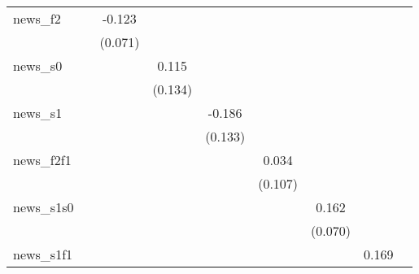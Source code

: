 {\begin{tabular}{l*{8}{c}}
news\_f2     &                     &      -0.123\sym{*}  &                     &                     &                     &                     &                     &                     \\
            &                     &     (0.071)         &                     &                     &                     &                     &                     &                     \\
\addlinespace
news\_s0     &                     &                     &       0.115         &                     &                     &                     &                     &                     \\
            &                     &                     &     (0.134)         &                     &                     &                     &                     &                     \\
\addlinespace
news\_s1     &                     &                     &                     &      -0.186         &                     &                     &                     &                     \\
            &                     &                     &                     &     (0.133)         &                     &                     &                     &                     \\
\addlinespace
news\_f2f1   &                     &                     &                     &                     &       0.034         &                     &                     &                     \\
            &                     &                     &                     &                     &     (0.107)         &                     &                     &                     \\
\addlinespace
news\_s1s0   &                     &                     &                     &                     &                     &       0.162\sym{**} &                     &                     \\
            &                     &                     &                     &                     &                     &     (0.070)         &                     &                     \\
\addlinespace
news\_s1f1   &                     &                     &                     &                     &                     &                     &       0.169         &                     \\

\end{tabular}}
